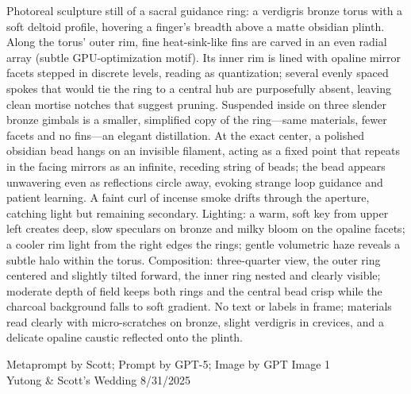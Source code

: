 \documentclass[10pt]{article}
\begin{document}
\noindent
\begin{adjustbox}{max size={\textwidth}{\textheight}}
\begin{varwidth}{\textwidth}
\RaggedRight
\footnotesize
Photoreal sculpture still of a sacral guidance ring: a verdigris bronze torus with a soft deltoid profile, hovering a finger’s breadth above a matte obsidian plinth. Along the torus’ outer rim, fine heat-sink-like fins are carved in an even radial array (subtle GPU-optimization motif). Its inner rim is lined with opaline mirror facets stepped in discrete levels, reading as quantization; several evenly spaced spokes that would tie the ring to a central hub are purposefully absent, leaving clean mortise notches that suggest pruning. Suspended inside on three slender bronze gimbals is a smaller, simplified copy of the ring—same materials, fewer facets and no fins—an elegant distillation. At the exact center, a polished obsidian bead hangs on an invisible filament, acting as a fixed point that repeats in the facing mirrors as an infinite, receding string of beads; the bead appears unwavering even as reflections circle away, evoking strange loop guidance and patient learning. A faint curl of incense smoke drifts through the aperture, catching light but remaining secondary. Lighting: a warm, soft key from upper left creates deep, slow speculars on bronze and milky bloom on the opaline facets; a cooler rim light from the right edges the rings; gentle volumetric haze reveals a subtle halo within the torus. Composition: three-quarter view, the outer ring centered and slightly tilted forward, the inner ring nested and clearly visible; moderate depth of field keeps both rings and the central bead crisp while the charcoal background falls to soft gradient. No text or labels in frame; materials read clearly with micro-scratches on bronze, slight verdigris in crevices, and a delicate opaline caustic reflected onto the plinth.
\end{varwidth}
\end{adjustbox}
\vfill
{\raggedleft\footnotesize
Metaprompt by Scott; Prompt by GPT-5; Image by GPT Image 1 \\
Yutong \& Scott's Wedding 8/31/2025\par}
\end{document}
